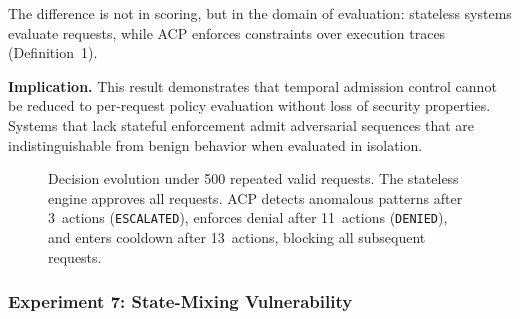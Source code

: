 \documentclass[11pt]{article}
\theoremstyle{definition}
\begin{document}
The difference is not in scoring, but in the domain of evaluation: stateless
systems evaluate requests, while ACP enforces constraints over execution traces
(Definition~1).

\textbf{Implication.}
This result demonstrates that temporal admission control cannot be reduced to
per-request policy evaluation without loss of security properties. Systems that
lack stateful enforcement admit adversarial sequences that are indistinguishable
from benign behavior when evaluated in isolation.

\begin{figure}[h]
\centering
{}
\caption{Decision evolution under 500 repeated valid requests. The stateless
engine approves all requests. ACP detects anomalous patterns after 3~actions
(\texttt{ESCALATED}), enforces denial after 11~actions (\texttt{DENIED}), and
enters cooldown after 13~actions, blocking all subsequent requests.}
\label{fig:exp6-dynamics}
\end{figure}

\subsubsection*{Experiment 7: State-Mixing Vulnerability}
\end{document}
